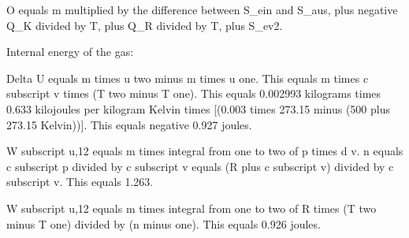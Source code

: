 O equals m multiplied by the difference between S_ein and S_aus, plus negative Q_K divided by T, plus Q_R divided by T, plus S_ev2.

Internal energy of the gas:  

Delta U equals m times u two minus m times u one.  
This equals m times c subscript v times (T two minus T one).  
This equals 0.002993 kilograms times 0.633 kilojoules per kilogram Kelvin times [(0.003 times 273.15 minus (500 plus 273.15 Kelvin))].  
This equals negative 0.927 joules.  

W subscript u,12 equals m times integral from one to two of p times d v.  
n equals c subscript p divided by c subscript v equals (R plus c subscript v) divided by c subscript v.  
This equals 1.263.  

W subscript u,12 equals m times integral from one to two of R times (T two minus T one) divided by (n minus one).  
This equals 0.926 joules.
